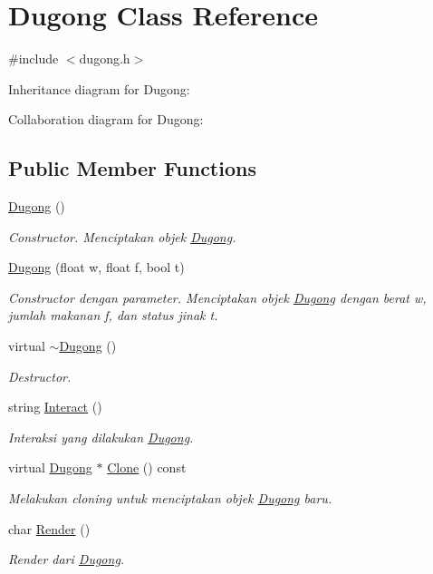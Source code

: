 \hypertarget{classDugong}{}\section{Dugong Class Reference}
\label{classDugong}


{\ttfamily \#include $<$dugong.\+h$>$}



Inheritance diagram for Dugong\+:


Collaboration diagram for Dugong\+:
\subsection*{Public Member Functions}
\begin{DoxyCompactItemize}
\item 
\hyperlink{classDugong_ab18a993807c0daa4b4a7eeaf7118ead7}{Dugong} ()
\begin{DoxyCompactList}\small\item\em Constructor. Menciptakan objek \hyperlink{classDugong}{Dugong}. \end{DoxyCompactList}\item 
\hyperlink{classDugong_af4aa8ab8370bbea5ccb75f5dd104f8e8}{Dugong} (float w, float f, bool t)
\begin{DoxyCompactList}\small\item\em Constructor dengan parameter. Menciptakan objek \hyperlink{classDugong}{Dugong} dengan berat w, jumlah makanan f, dan status jinak t. \end{DoxyCompactList}\item 
virtual \hyperlink{classDugong_a0fe188826a301ecf2b90f2eb60c9e5da}{$\sim$\+Dugong} ()
\begin{DoxyCompactList}\small\item\em Destructor. \end{DoxyCompactList}\item 
string \hyperlink{classDugong_a861c589c05a791faf03297eb6e718d9e}{Interact} ()
\begin{DoxyCompactList}\small\item\em Interaksi yang dilakukan \hyperlink{classDugong}{Dugong}. \end{DoxyCompactList}\item 
virtual \hyperlink{classDugong}{Dugong} $\ast$ \hyperlink{classDugong_a8209b4208bd32dfc0fa4e701679306c1}{Clone} () const 
\begin{DoxyCompactList}\small\item\em Melakukan cloning untuk menciptakan objek \hyperlink{classDugong}{Dugong} baru. \end{DoxyCompactList}\item 
char \hyperlink{classDugong_af82a8983c960604aa27dabe7fec53362}{Render} ()
\begin{DoxyCompactList}\small\item\em Render dari \hyperlink{classDugong}{Dugong}. \end{DoxyCompactList}\end{DoxyCompactItemize}
